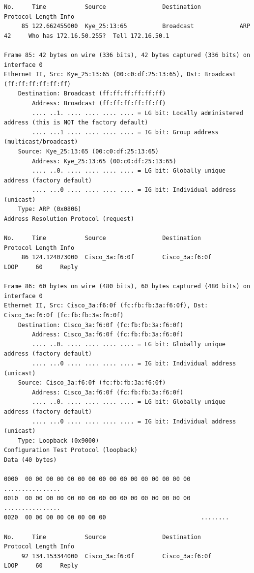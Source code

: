\documentclass[a4paper,11pt]{article}
\begin{document}
\begin{lstlisting}
No.     Time           Source                Destination           Protocol Length Info
     85 122.662455000  Kye_25:13:65          Broadcast             ARP      42     Who has 172.16.50.255?  Tell 172.16.50.1

Frame 85: 42 bytes on wire (336 bits), 42 bytes captured (336 bits) on interface 0
Ethernet II, Src: Kye_25:13:65 (00:c0:df:25:13:65), Dst: Broadcast (ff:ff:ff:ff:ff:ff)
    Destination: Broadcast (ff:ff:ff:ff:ff:ff)
        Address: Broadcast (ff:ff:ff:ff:ff:ff)
        .... ..1. .... .... .... .... = LG bit: Locally administered address (this is NOT the factory default)
        .... ...1 .... .... .... .... = IG bit: Group address (multicast/broadcast)
    Source: Kye_25:13:65 (00:c0:df:25:13:65)
        Address: Kye_25:13:65 (00:c0:df:25:13:65)
        .... ..0. .... .... .... .... = LG bit: Globally unique address (factory default)
        .... ...0 .... .... .... .... = IG bit: Individual address (unicast)
    Type: ARP (0x0806)
Address Resolution Protocol (request)

No.     Time           Source                Destination           Protocol Length Info
     86 124.124073000  Cisco_3a:f6:0f        Cisco_3a:f6:0f        LOOP     60     Reply

Frame 86: 60 bytes on wire (480 bits), 60 bytes captured (480 bits) on interface 0
Ethernet II, Src: Cisco_3a:f6:0f (fc:fb:fb:3a:f6:0f), Dst: Cisco_3a:f6:0f (fc:fb:fb:3a:f6:0f)
    Destination: Cisco_3a:f6:0f (fc:fb:fb:3a:f6:0f)
        Address: Cisco_3a:f6:0f (fc:fb:fb:3a:f6:0f)
        .... ..0. .... .... .... .... = LG bit: Globally unique address (factory default)
        .... ...0 .... .... .... .... = IG bit: Individual address (unicast)
    Source: Cisco_3a:f6:0f (fc:fb:fb:3a:f6:0f)
        Address: Cisco_3a:f6:0f (fc:fb:fb:3a:f6:0f)
        .... ..0. .... .... .... .... = LG bit: Globally unique address (factory default)
        .... ...0 .... .... .... .... = IG bit: Individual address (unicast)
    Type: Loopback (0x9000)
Configuration Test Protocol (loopback)
Data (40 bytes)

0000  00 00 00 00 00 00 00 00 00 00 00 00 00 00 00 00   ................
0010  00 00 00 00 00 00 00 00 00 00 00 00 00 00 00 00   ................
0020  00 00 00 00 00 00 00 00                           ........

No.     Time           Source                Destination           Protocol Length Info
     92 134.153344000  Cisco_3a:f6:0f        Cisco_3a:f6:0f        LOOP     60     Reply


\end{lstlisting}
\end{document}
